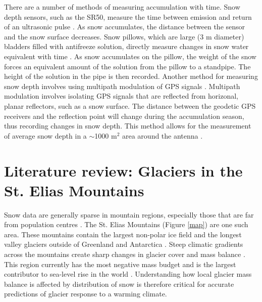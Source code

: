 \documentclass{sfuthesis}
\begin{document}
\begin{appendices}
There are a number of methods of measuring accumulation with time. Snow depth sensors, such as the SR50, measure the time between emission and return of an ultrasonic pulse \citep{Ryan2008}. As snow accumulates, the distance between the sensor and the snow surface decreases. Snow pillows, which are large (3 m diameter) bladders filled with antifreeze solution, directly measure changes in snow water equivalent with time \citep{Archer1995}. As snow accumulates on the pillow, the weight of the snow forces an equivalent amount of the solution from the pillow to a standpipe. The height of the solution in the pipe is then recorded. Another method for measuring snow depth involves using multipath modulation of GPS signals \citep{Larson2009,McCreight2014}. Multipath modulation involves isolating GPS signals that are reflected from horizonal, planar reflectors, such as a snow surface. The distance between the geodetic GPS receivers and the reflection point will change during the accumulation season, thus recording changes in snow depth. This method allows for the measurement of average snow depth in a $\sim$1000 m$^2$ area around the antenna \citep{McCreight2014}.

\chapter{Literature review: Glaciers in the St. Elias Mountains}

Snow data are generally sparse in mountain regions, especially those that are far from population centres \citep{Marcus1970}. The St. Elias Mountains (Figure \ref{map}) are one such area. These mountains contain the largest non-polar ice field and the longest valley glaciers outside of Greenland and Antarctica \citep{Marcus1970, Danby2003}. Steep climatic gradients across the mountains create sharp changes in glacier cover and mass balance \citep{Clarke2002}. This region currently has the most negative mass budget and is the largest contributor to sea-level rise in the world \citep{Kaser2006, Gardner2013}. Understanding how local glacier mass balance is affected by distribution of snow is therefore critical for accurate predictions of glacier response to a warming climate. 


\end{appendices}
\end{document}
